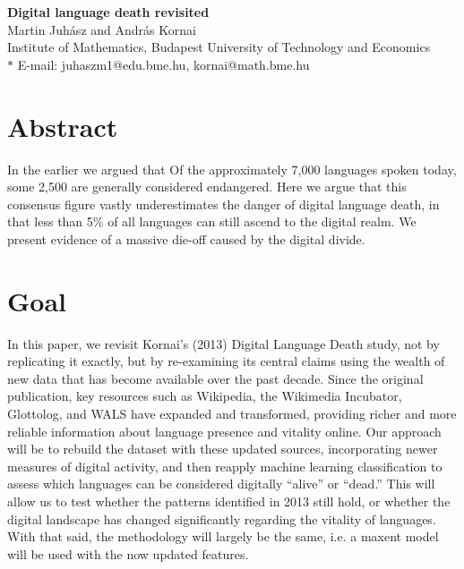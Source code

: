 \documentclass[10pt]{article}
\date{}
\begin{document}
\begin{flushleft}
{\Large
\textbf{Digital language death revisited}
}
\\
Martin Juh\'asz and Andr\'as Kornai %
\\
Institute of Mathematics, Budapest University of Technology and Economics\\
$\ast$ E-mail: juhaszm1@edu.bme.hu, kornai@math.bme.hu
\end{flushleft}

\section*{Abstract}

In the earlier \cite{Kornai:2013c} we argued that 
Of the approximately 7,000 languages spoken today, some 2,500 are generally
considered endangered. Here we argue that this consensus figure vastly
underestimates the danger of digital language death, in that less than 5\% of
all languages can {\color{black} still ascend to the digital realm}. We present evidence of a
massive die-off caused by the digital divide.


\section*{Goal}
In this paper, we revisit Kornai’s (2013) Digital Language Death study, not by replicating it exactly, but by re-examining its central claims using the wealth of new data that has become available over the past decade. Since the original publication, key resources such as Wikipedia, the Wikimedia Incubator, Glottolog, and WALS have expanded and transformed, providing richer and more reliable information about language presence and vitality online. Our approach will be to rebuild the dataset with these updated sources, incorporating newer measures of digital activity, and then reapply machine learning classification to assess which languages can be considered digitally “alive” or “dead.” This will allow us to test whether the patterns identified in 2013 still hold, or whether the digital landscape has changed significantly regarding the vitality of languages. \\
With that said, the methodology will largely be the same, i.e. a maxent model will be used with the now updated features.
\end{document}
